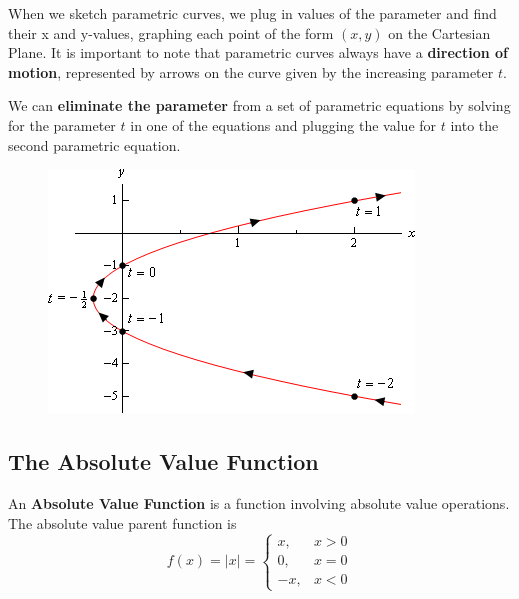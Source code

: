         \noindent When we sketch parametric curves, we plug in values of the parameter and find
        their x and y-values, graphing each point of the form $(x,y)$ on the Cartesian Plane.
        It is important to note that parametric curves always have a \textbf{direction of motion},
        represented by arrows on the curve given by the increasing parameter $t$.

        \noindent We can \textbf{eliminate the parameter} from a set of parametric equations by
        solving for the parameter $t$ in one of the equations and plugging the value for $t$ into
        the second parametric equation.\\

        \begin{figure} [hbt!]
            \centering
            \includegraphics [scale = 0.5] {Resources/Unit9EvenMoreFunctions/param.png}
        \end{figure}



    \subsection{The Absolute Value Function}
        An \textbf{Absolute Value Function} is a function involving absolute value operations.
        The absolute value parent function is \\

        \begin{equation*}
            f(x)=|x|=
            \begin{cases}
                x, & x>0 \\
                0, & x=0 \\
                -x, & x<0
            \end{cases}
        \end{equation*}

